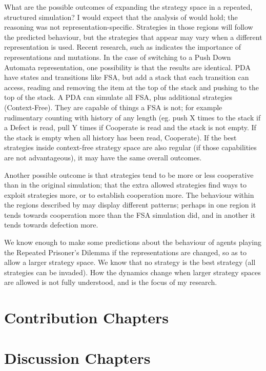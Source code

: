 \documentclass[a4paper,11pt,bcshonoursthesis,singlespace,twoside]{cssethesis}
\begin{document}
What are the possible outcomes of expanding the strategy space in a repeated, structured simulation? 
I would expect that the analysis of \citet{van-veelen:PNAS:2012} would hold; the reasoning was not representation-specific. 
Strategies in those regions will follow the predicted behaviour, but the strategies that appear may vary when a different representation is used. 
Recent research, such as \citet{garcia:PLoSOne:2012} indicates the importance of representations and mutations. 
In the case of switching to a Push Down Automata representation, one possibility is that the results are identical. 
PDA have states and transitions like FSA, but add a stack that each transition can access, reading and removing the item at the top of the stack and pushing to the top of the stack. 
A PDA can simulate all FSA, plus additional strategies (Context-Free)\citep{Sipser2006}.  
They are capable of things a FSA is not; for example rudimentary counting with history of any length (eg. push X times to the stack if a Defect is read, pull Y times if Cooperate is read and the stack is not empty. If the stack is empty when all history has been read, Cooperate). If the best strategies inside context-free strategy space are also regular (if those capabilities are not advantageous), it may have the same overall outcomes.  

Another possible outcome is that strategies tend to be more or less cooperative than in the original simulation; that the extra allowed strategies find ways to exploit strategies more, or to establish cooperation more. 
The behaviour within the regions described by \citet{van-veelen:PNAS:2012} may display different patterns; perhaps in one region it tends towards cooperation more than the FSA simulation did, and in another it tends towards defection more. 

We know enough to make some predictions about the behaviour of agents playing the Repeated Prisoner's Dilemma if the representations are changed, so as to allow a larger strategy space. 
We know that no strategy is the best strategy (all strategies can be invaded). 
How the dynamics change when larger strategy spaces are allowed is not fully understood, and is the focus of my research.
\chapter{Contribution Chapters}

\chapter{Discussion Chapters}
\end{document}
